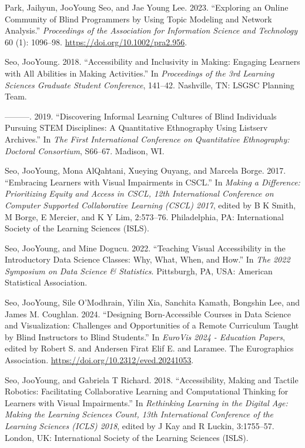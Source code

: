 \documentclass[11pt,a4paper,]{awesome-cv}
\newlength{\cslhangindent}
\newenvironment{CSLReferences}[2] %
 {\begin{list}{}{%
  \setlength{\itemindent}{0pt}
  \setlength{\leftmargin}{0pt}
  \setlength{\parsep}{0pt}
  \ifodd #1
   \setlength{\leftmargin}{\cslhangindent}
   \setlength{\itemindent}{-1\cslhangindent}
  \fi
  \setlength{\itemsep}{#2\baselineskip}}}
 {\end{list}}
\begin{document}
\begin{CSLReferences}{1}{0}
Park, Jaihyun, JooYoung Seo, and Jae Young Lee. 2023. {``Exploring an
Online Community of Blind Programmers by Using Topic Modeling and
Network Analysis.''} \emph{Proceedings of the Association for
Information Science and Technology} 60 (1): 1096--98.
\url{https://doi.org/10.1002/pra2.956}.

Seo, JooYoung. 2018. {``Accessibility and Inclusivity in Making:
Engaging Learners with All Abilities in Making Activities.''} In
\emph{Proceedings of the 3rd Learning Sciences Graduate Student
Conference}, 141--42. Nashville, TN: LSGSC Planning Team.

---------. 2019. {``Discovering Informal Learning Cultures of Blind
Individuals Pursuing STEM Disciplines: A Quantitative Ethnography Using
Listserv Archives.''} In \emph{The First International Conference on
Quantitative Ethnography: Doctoral Consortium}, S66--67. Madison, WI.

Seo, JooYoung, Mona AlQahtani, Xueying Ouyang, and Marcela Borge. 2017.
{``Embracing Learners with Visual Impairments in CSCL.''} In
\emph{Making a Difference: Prioritizing Equity and Access in CSCL, 12th
International Conference on Computer Supported Collaborative Learning
(CSCL) 2017}, edited by B K Smith, M Borge, E Mercier, and K Y Lim,
2:573--76. Philadelphia, PA: International Society of the Learning
Sciences (ISLS).

Seo, JooYoung, and Mine Dogucu. 2022. {``Teaching Visual Accessibility
in the Introductory Data Science Classes: Why, What, When, and How.''}
In \emph{The 2022 Symposium on Data Science \& Statistics}. Pittsburgh,
PA, USA: American Statistical Association.

Seo, JooYoung, Sile O'Modhrain, Yilin Xia, Sanchita Kamath, Bongshin
Lee, and James M. Coughlan. 2024. {``Designing Born-Accessible Courses
in Data Science and Visualization: Challenges and Opportunities of a
Remote Curriculum Taught by Blind Instructors to Blind Students.''} In
\emph{EuroVis 2024 - Education Papers}, edited by Robert S. and Andersen
Firat Elif E. and Laramee. The Eurographics Association.
\url{https://doi.org/10.2312/eved.20241053}.

Seo, JooYoung, and Gabriela T Richard. 2018. {``Accessibility, Making
and Tactile Robotics: Facilitating Collaborative Learning and
Computational Thinking for Learners with Visual Impairments.''} In
\emph{Rethinking Learning in the Digital Age: Making the Learning
Sciences Count, 13th International Conference of the Learning Sciences
(ICLS) 2018}, edited by J Kay and R Luckin, 3:1755--57. London, UK:
International Society of the Learning Sciences (ISLS).


\end{CSLReferences}
\end{document}
